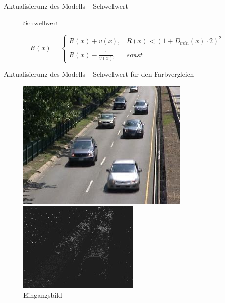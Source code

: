 \documentclass[hyperref={pdfpagelabels=false}]{beamer}
\begin{document}
\begin{frame}[t]{Aktualisierung des Modells -- Schwellwert}
\begin{figure}
\begin{minipage}{0.45\linewidth}
			\caption*{Schwellwert}
		\end{minipage}
	\end{figure}
	\bigskip
	\begin{equation*}
		R(x)= 	\left\{
				\begin{array}{ll} 
					R(x) + v(x), &  R(x) < (1 + D_{min}(x) \cdot 2)^2 \\
					\\
					R(x) - \frac{1}{v(x)}, & sonst
				\end{array}
			\right .
	\end{equation*}
\end{frame}

\begin{frame}[t]{Aktualisierung des Modells -- Schwellwert für den Farbvergleich}
	\begin{figure}
		\centering
		\begin{minipage}{0.45\linewidth}
			\includegraphics[width=1\linewidth]{Abbildungen/Eingang3.jpg}
			\caption*{Eingangsbild}
		\end{minipage}
		\begin{minipage}{0.45\linewidth}
			\includegraphics[width=1\linewidth]{Abbildungen/R_color.jpg}

\end{minipage}
\end{figure}
\end{frame}
\end{document}
